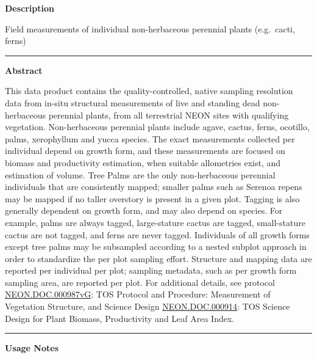 \documentclass[]{article}
\begin{document}
\textbf{Description}

Field measurements of individual non-herbaceous perennial plants
(e.g.~cacti, ferns)

\begin{center}\rule{0.5\linewidth}{\linethickness}\end{center}

\textbf{Abstract}

This data product contains the quality-controlled, native sampling
resolution data from in-situ structural measurements of live and
standing dead non-herbaceous perennial plants, from all terrestrial NEON
sites with qualifying vegetation. Non-herbaceous perennial plants
include agave, cactus, ferns, ocotillo, palms, xerophyllum and yucca
species. The exact measurements collected per individual depend on
growth form, and these measurements are focused on biomass and
productivity estimation, when suitable allometries exist, and estimation
of volume. Tree Palms are the only non-herbaceous perennial individuals
that are consistently mapped; smaller palms such as Serenoa repens may
be mapped if no taller overstory is present in a given plot. Tagging is
also generally dependent on growth form, and may also depend on species.
For example, palms are always tagged, large-stature cactus are tagged,
small-stature cactus are not tagged, and ferns are never tagged.
Individuals of all growth forms except tree palms may be subsampled
according to a nested subplot approach in order to standardize the per
plot sampling effort. Structure and mapping data are reported per
individual per plot; sampling metadata, such as per growth form sampling
area, are reported per plot. For additional details, see protocol
\href{http://data.neonscience.org/api/v0/documents/NEON.DOC.000987vG}{NEON.DOC.000987vG}:
TOS Protocol and Procedure: Measurement of Vegetation Structure, and
Science Design
\href{http://data.neonscience.org/api/v0/documents/NEON.DOC.000914vA}{NEON.DOC.000914}:
TOS Science Design for Plant Biomass, Productivity and Leaf Area Index.

\begin{center}\rule{0.5\linewidth}{\linethickness}\end{center}

\textbf{Usage Notes}
\end{document}
